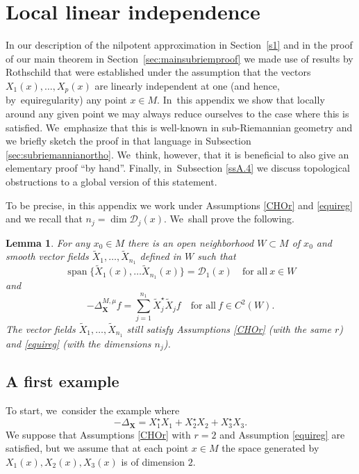 \documentclass[JEP,XML,SOM,Unicode,published]{cedram}
\DeclareMathOperator{\Span}{span}
\newcommand{\bX}{{\boldsymbol{X}}}
\newtheorem{lemma}[theorem]{Lemma}
\theoremstyle{definition}
\let\Xb\bX
\newcommand{\1}{\mathbbm{1}}
\begin{document}
\section{Local linear independence}\label{AppA2}

In our description of the nilpotent approximation in Section~\ref{s1} and in the proof of our main theorem in Section~\ref{sec:mainsubriemproof} we made use of results by Rothschild \cite{Rot} that were established under the assumption that the vectors $X_1(x),\ldots,X_p(x)$ are linearly independent at one (and hence, by~equiregularity) any point $x\in M$. In~this appendix we show that locally around any given point we may always reduce ourselves to the case where this is satisfied. We~emphasize that this is well-known in sub-Riemannian geometry and we briefly sketch the proof in that language in Subsection \ref{sec:subriemannianortho}. We~think, however, that it is beneficial to also give an elementary proof ``by hand''. Finally, in~Subsection \ref{ssA.4} we discuss topological obstructions to a global version of this statement.

To be precise, in this appendix we work under Assumptions \ref{CHOr} and \ref{equireg} and we recall that $n_j=\dim\mathcal D_j(x)$. We~shall prove the following.

\begin{lemma}\label{locindep}
For any $x_0\in M$ there is an open neighborhood $W\subset M$ of $x_0$ and smooth vector fields $\tilde X_1,\ldots,\tilde X_{n_1}$ defined in $W$ such that
\begin{equation}
\label{eq:loclinindepapp}
\Span\{ \tilde X_1(x),\ldots \tilde X_{n_1}(x) \} = \mathcal D_1(x)
\quad\text{for all}\ x\in W
\end{equation}
and
\[
-\Delta_\bX^{M,\mu} f = \sum_{j=1}^{n_1} \tilde X_j^\star \tilde X_j f
\quad\text{for all} \ f\in C^2(W).
\]
The vector fields $\tilde X_1,\ldots,\tilde X_{n_1}$ still satisfy Assumptions \ref{CHOr} (with the same $r$) and \ref{equireg} (with the dimensions $n_j$).
\end{lemma}

\subsection{A first example}
To start, we~consider the example where
\[
-\Delta_\Xb = X_1^\star X_1 + X_2^\star X_2 + X_3^\star X_3.
\]
We suppose that Assumptions \ref{CHOr} with $r=2$ and Assumption \ref{equireg} are satisfied, but we assume that at each point $x\in M$ the space generated by $X_1(x), X_2(x), X_3(x)$ is of dimension $2$.
\end{document}
